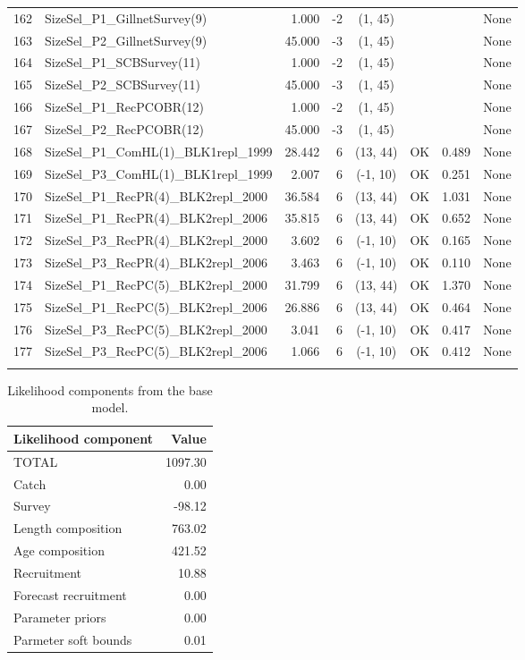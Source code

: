 \documentclass[12pt,]{article}
\begin{document}
\begin{landscape}
\begin{longtable}{rlrrcccl}
  162 & SizeSel\_P1\_GillnetSurvey(9) & 1.000 & -2 & (1, 45) &  &  & None \\ 
  163 & SizeSel\_P2\_GillnetSurvey(9) & 45.000 & -3 & (1, 45) &  &  & None \\ 
  164 & SizeSel\_P1\_SCBSurvey(11) & 1.000 & -2 & (1, 45) &  &  & None \\ 
  165 & SizeSel\_P2\_SCBSurvey(11) & 45.000 & -3 & (1, 45) &  &  & None \\ 
  166 & SizeSel\_P1\_RecPCOBR(12) & 1.000 & -2 & (1, 45) &  &  & None \\ 
  167 & SizeSel\_P2\_RecPCOBR(12) & 45.000 & -3 & (1, 45) &  &  & None \\ 
  168 & SizeSel\_P1\_ComHL(1)\_BLK1repl\_1999 & 28.442 & 6 & (13, 44) & OK & 0.489 & None \\ 
  169 & SizeSel\_P3\_ComHL(1)\_BLK1repl\_1999 & 2.007 & 6 & (-1, 10) & OK & 0.251 & None \\ 
  170 & SizeSel\_P1\_RecPR(4)\_BLK2repl\_2000 & 36.584 & 6 & (13, 44) & OK & 1.031 & None \\ 
  171 & SizeSel\_P1\_RecPR(4)\_BLK2repl\_2006 & 35.815 & 6 & (13, 44) & OK & 0.652 & None \\ 
  172 & SizeSel\_P3\_RecPR(4)\_BLK2repl\_2000 & 3.602 & 6 & (-1, 10) & OK & 0.165 & None \\ 
  173 & SizeSel\_P3\_RecPR(4)\_BLK2repl\_2006 & 3.463 & 6 & (-1, 10) & OK & 0.110 & None \\ 
  174 & SizeSel\_P1\_RecPC(5)\_BLK2repl\_2000 & 31.799 & 6 & (13, 44) & OK & 1.370 & None \\ 
  175 & SizeSel\_P1\_RecPC(5)\_BLK2repl\_2006 & 26.886 & 6 & (13, 44) & OK & 0.464 & None \\ 
  176 & SizeSel\_P3\_RecPC(5)\_BLK2repl\_2000 & 3.041 & 6 & (-1, 10) & OK & 0.417 & None \\ 
  177 & SizeSel\_P3\_RecPC(5)\_BLK2repl\_2006 & 1.066 & 6 & (-1, 10) & OK & 0.412 & None \\ 
   \hline
\hline
\label{tab:model_params}
\end{longtable}
\end{landscape}

\FloatBarrier

\begin{table}[ht]
\centering
\caption{Likelihood components from the base model.} 
\label{tab:like_components}
\begin{tabular}{lr}
  \hline
Likelihood component & Value \\ 
  \hline
TOTAL & 1097.30 \\ 
  Catch & 0.00 \\ 
  Survey & -98.12 \\ 
  Length composition & 763.02 \\ 
  Age composition & 421.52 \\ 
  Recruitment & 10.88 \\ 
  Forecast recruitment & 0.00 \\ 
  Parameter priors & 0.00 \\ 
  Parmeter soft bounds & 0.01 \\ 
   \hline
\end{tabular}
\end{table}
\end{document}
